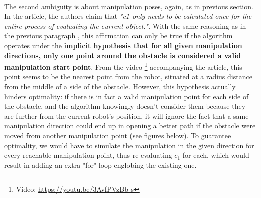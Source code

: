 \paragraph{} The second ambiguity is about manipulation poses, again, as in previous section. In the article, the authors claim that \textit{"c1 only needs to be calculated once for the entire process of evaluating the current object."}. With the same reasoning as in the previous paragraph , this affirmation can only be true if the algorithm operates under the \textbf{implicit hypothesis that for all given manipulation directions, only one point around the obstacle is considered a valid manipulation start point}. From the video \footnote{Video: \url{https://youtu.be/3AvfPVzBb-s}} accompanying the article, this point seems to be the nearest point from the robot, situated at a radius distance from the middle of a side of the obstacle. However, this hypothesis actually hinders optimality: if there is in fact a valid manipulation point for each side of the obstacle, and the algorithm knowingly doesn't consider them because they are further from the current robot's position, it will ignore the fact that a same manipulation direction could end up in opening a better path if the obstacle were moved from another manipulation point (see figures below). To guarantee optimality, we would have to simulate the manipulation in the given direction for every reachable manipulation point, thus re-evaluating $c_{1}$ for each, which would result in adding an extra "for" loop englobing the existing one.

